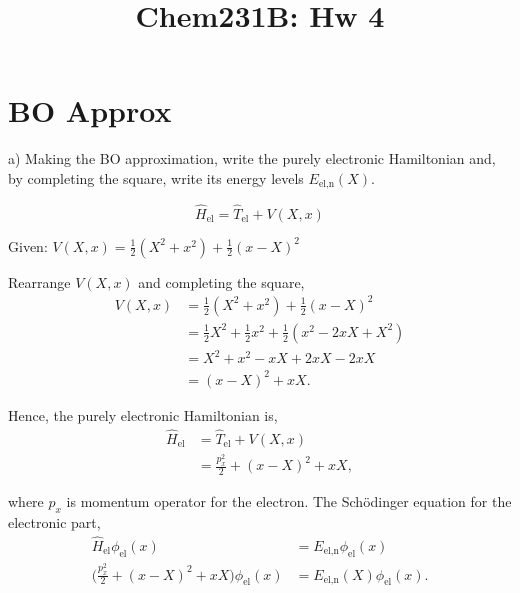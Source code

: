 \documentclass{article}
\title{Chem231B: Hw 4} %
\begin{document}
\maketitle

\section*{\textbf{BO Approx}}

a) Making the BO approximation, write the purely electronic Hamiltonian and, by
completing the square, write its energy levels $E_{\text{el,n}}(X)$.

\begin{equation}
  \hat{H}_{\text{el}} = \hat{T}_{\text{el}} + V(X,x)
\end{equation}

Given: $V(X,x) = \frac{1}{2}(X^2+x^2) + \frac{1}{2}(x-X)^2$

Rearrange $V(X,x)$ and completing the square,
\begin{align}
  V(X,x) & = \frac{1}{2}(X^2+x^2) + \frac{1}{2}(x-X)^2 \nonumber \\
  & = \frac{1}{2}X^2+\frac{1}{2}x^2 + \frac{1}{2}(x^2-2xX+X^2) \nonumber \\
  & = X^2 + x^2 - xX + 2xX - 2xX \nonumber\\
  & = (x - X)^2 + xX.
\end{align}

Hence, the purely electronic Hamiltonian is,
\begin{align}
  \hat{H}_{\text{el}} & = \hat{T}_{\text{el}} + V(X,x) \nonumber\\
  & = \frac{p_x^2}{2} + (x - X)^2 + xX,
\end{align}

where $p_x$ is momentum operator for the electron. The Sch\"odinger equation
for the electronic part,
\begin{align}
  \hat{H}_{\text{el}}\phi_{\text{el}}(x) & = E_{\text{el,n}}\phi_{\text{el}}(x) \\
  \Bigg(\frac{p_x^2}{2} + (x - X)^2 + xX\Bigg)\phi_{\text{el}}(x)
  & =E_{\text{el,n}}(X)\phi_{\text{el}}(x). \label{eqn:elec}
\end{align}
\end{document}
